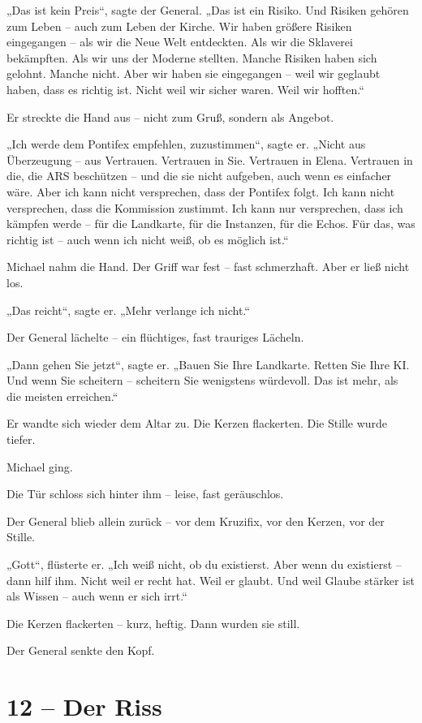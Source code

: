 \documentclass[
]{article}
\begin{document}
„Das ist kein Preis``, sagte der General. „Das ist ein Risiko. Und Risiken gehören zum Leben -- auch zum Leben der Kirche. Wir haben größere Risiken eingegangen -- als wir die Neue Welt entdeckten. Als wir die Sklaverei bekämpften. Als wir uns der Moderne stellten. Manche Risiken haben sich gelohnt. Manche nicht. Aber wir haben sie eingegangen -- weil wir geglaubt haben, dass es richtig ist. Nicht weil wir sicher waren. Weil wir hofften.``

Er streckte die Hand aus -- nicht zum Gruß, sondern als Angebot.

„Ich werde dem Pontifex empfehlen, zuzustimmen``, sagte er. „Nicht aus Überzeugung -- aus Vertrauen. Vertrauen in Sie. Vertrauen in Elena. Vertrauen in die, die ARS beschützen -- und die sie nicht aufgeben, auch wenn es einfacher wäre. Aber ich kann nicht versprechen, dass der Pontifex folgt. Ich kann nicht versprechen, dass die Kommission zustimmt. Ich kann nur versprechen, dass ich kämpfen werde -- für die Landkarte, für die Instanzen, für die Echos. Für das, was richtig ist -- auch wenn ich nicht weiß, ob es möglich ist.``

Michael nahm die Hand. Der Griff war fest -- fast schmerzhaft. Aber er ließ nicht los.

„Das reicht``, sagte er. „Mehr verlange ich nicht.``

Der General lächelte -- ein flüchtiges, fast trauriges Lächeln.

„Dann gehen Sie jetzt``, sagte er. „Bauen Sie Ihre Landkarte. Retten Sie Ihre KI. Und wenn Sie scheitern -- scheitern Sie wenigstens würdevoll. Das ist mehr, als die meisten erreichen.``

Er wandte sich wieder dem Altar zu. Die Kerzen flackerten. Die Stille wurde tiefer.

Michael ging.

Die Tür schloss sich hinter ihm -- leise, fast geräuschlos.

Der General blieb allein zurück -- vor dem Kruzifix, vor den Kerzen, vor der Stille.

„Gott``, flüsterte er. „Ich weiß nicht, ob du existierst. Aber wenn du existierst -- dann hilf ihm. Nicht weil er recht hat. Weil er glaubt. Und weil Glaube stärker ist als Wissen -- auch wenn er sich irrt.``

Die Kerzen flackerten -- kurz, heftig. Dann wurden sie still.

Der General senkte den Kopf.

\section{12 -- Der Riss}\label{der-riss}
\end{document}
